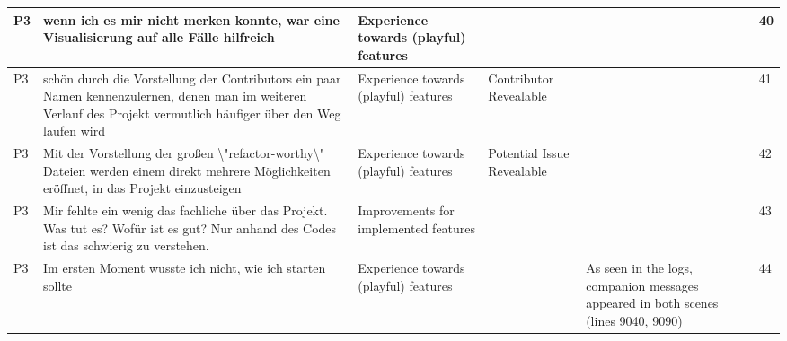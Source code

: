 \begin{appendices}
\begin{landscape}
\begin{longtable}{|p{0.8cm}|p{7cm}|p{3cm}|p{3cm}|p{5.5cm}|p{0.5cm}|}
      P3                   & wenn ich es mir nicht merken konnte, war eine Visualisierung auf alle Fälle hilfreich                                                                                                                                                                                       & Experience towards (playful) features    &                                    &                                                                                                                                                    & 40           \\ \hline
      P3                   & schön durch die Vorstellung der Contributors ein paar Namen kennenzulernen, denen man im weiteren Verlauf des Projekt vermutlich häufiger über den Weg laufen wird                                                                                                          & Experience towards (playful) features    & Contributor Revealable             &                                                                                                                                                    & 41           \\ \hline
      P3                   & Mit der Vorstellung der großen \textbackslash{}"refactor-worthy\textbackslash{}" Dateien werden einem direkt mehrere Möglichkeiten eröffnet, in das Projekt einzusteigen                                                                                                    & Experience towards (playful) features    & Potential Issue Revealable         &                                                                                                                                                    & 42           \\ \hline
      P3                   & Mir fehlte ein wenig das fachliche über das Projekt. Was tut es? Wofür ist es gut? Nur anhand des Codes ist das schwierig zu verstehen.                                                                                                                                     & Improvements for implemented features    &                                    &                                                                                                                                                    & 43           \\ \hline
      P3                   & Im ersten Moment wusste ich nicht, wie ich starten sollte                                                                                                                                                                                                                   & Experience towards (playful) features    &                                    & As seen in the logs, companion messages appeared in both scenes (lines 9040, 9090)                                                                 & 44           \\ \hline

\end{longtable}
\end{landscape}
\end{appendices}
